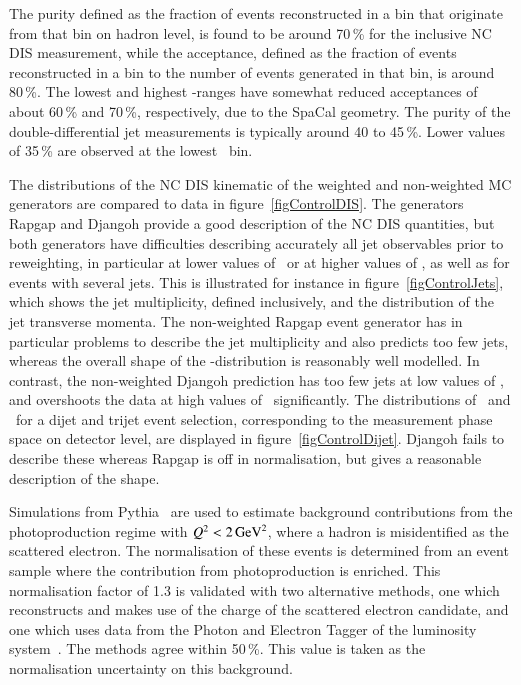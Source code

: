 \documentclass[12pt]{article}
\begin{document}
The purity defined as the fraction of events reconstructed
in a bin that originate from that bin on hadron level, is found
to be around 70\,\% for the inclusive NC DIS measurement, while the acceptance,
defined as the fraction of events reconstructed in a bin to the number
of events generated in that bin, is around 80\,\%.
The lowest and highest \Qsq-ranges have somewhat reduced acceptances of about 60\,\% and 70\,\%, respectively, due to the SpaCal geometry.
The purity of the double-differential jet measurements is typically around
40 to 45\,\%. Lower values of 35\,\% are observed at the lowest \pt\ bin.

The distributions of the NC DIS kinematic of the weighted and non-weighted MC generators are compared to data in figure~\ref{figControlDIS}. 
The generators Rapgap and Djangoh provide a good description of the NC DIS 
quantities, but both generators have difficulties describing accurately all
jet observables prior to reweighting, in particular
at lower values of \Qsq\ or at higher values of \ptjet, as well as for events with several jets.
This is illustrated for instance in figure~\ref{figControlJets}, which shows the jet multiplicity, defined inclusively, and the distribution of the jet transverse momenta.
The non-weighted Rapgap event generator has in particular problems to describe the jet multiplicity and also predicts too few jets, whereas the overall shape of the \ptjet-distribution is reasonably well modelled.
In contrast, the non-weighted Djangoh prediction has too few jets at low values of \ptjet, and overshoots the data at high values of \ptjet\ significantly.
The distributions of \meanptdi\ and \meanpttri\ for a dijet and trijet event selection, corresponding to the measurement phase space on detector level, are displayed in figure~\ref{figControlDijet}.
Djangoh fails to describe these whereas Rapgap is off in normalisation, but gives a reasonable description of the shape.

Simulations from Pythia~\cite{Pythia} are used to estimate background contributions from
the photoproduction regime with $\Qsq<2\,\GeVsq$, where a hadron is misidentified as the scattered electron.
The normalisation of these events is determined from an event sample where the contribution from photoproduction is enriched.
This normalisation factor of 1.3 is validated with two alternative methods, one which reconstructs and makes use of the charge of the scattered electron candidate,
and one which uses data from the
Photon and Electron Tagger of the luminosity system~\cite{Abt1,etagger}.
The methods agree within 50\,\%.
This value is taken as the normalisation uncertainty on this background.
\end{document}
